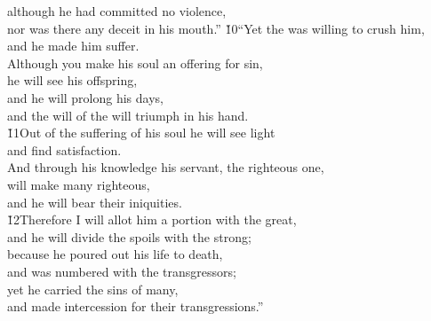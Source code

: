 \begin{poetry}
\poeml although he had committed no violence, \\
\poemll    nor was there any deceit in his mouth.''
\poeml \v{10}``Yet the  was willing to crush him, \\
\poemll    and he made him suffer. \\
\poeml Although you make his soul an offering for sin, \\
\poemll    he will see his offspring, \\
\poeml and he will prolong his days, \\
\poemll    and the will of the  will triumph in his hand. \\
\poeml \v{11}Out of the suffering of his soul he will see light \\
\poemll    and find satisfaction. \\
\poeml And through his knowledge his servant, the righteous one, \\
\poemll    will make many righteous, \\
\poemlll       and he will bear their iniquities. \\
\poeml \v{12}Therefore I will allot him a portion with the great, \\
\poemll    and he will divide the spoils with the strong; \\
\poeml because he poured out his life to death, \\
\poemll    and was numbered with the transgressors; \\
\poeml yet he carried the sins of many, \\
\poemll    and made intercession for their transgressions.''
\end{poetry}

